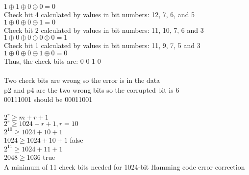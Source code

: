\documentclass[12pt,largemargins]{homework}
\begin{document}
$ 1 \oplus 1 \oplus 0 \oplus 0 = 0 $\\
Check bit 4 calculated by values in bit numbers: 12, 7, 6, and 5\\
$ 1 \oplus 0 \oplus 0 \oplus 1 = 0 $\\
Check bit 2 calculated by values in bit numbers: 11, 10, 7, 6 and 3\\
$ 1 \oplus 0 \oplus 0 \oplus 0 \oplus 0= 1 $\\
Check bit 1 calculated by values in bit numbers: 11, 9, 7, 5 and 3\\
$ 1 \oplus 0 \oplus 0 \oplus 1 \oplus 0 = 0 $\\
Thus, the check bits are: 0 0 1 0 \\
\\
Two check bits are wrong so the error is in the data\\
p2 and p4 are the two wrong bits so the corrupted bit is 6\\
00111001 should be 00011001\\
\\
$ 2^r \geq m + r+ 1 $\\
$ 2^r \geq 1024 + r + 1, r=10$\\
$ 2^10 \geq 1024 + 10 + 1 $\\
$ 1024 \geq 1024 +10 +1 $ false\\
$ 2^11 \geq 1024 +11 +1 $\\
$ 2048 \geq 1036 $ true \\
A minimum of 11 check bits needed for 1024-bit Hamming code error correction\\
\end{document}
